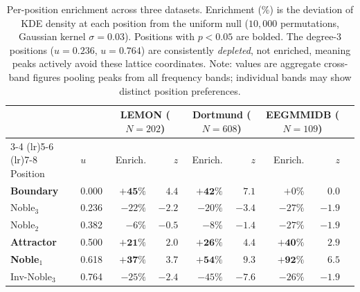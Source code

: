 \documentclass[11pt,a4paper]{article}
\begin{document}
\begin{table}[H]
\centering
\caption{Per-position enrichment across three datasets. Enrichment (\%) is the deviation of KDE density at each position from the uniform null ($10{,}000$ permutations, Gaussian kernel $\sigma = 0.03$). Positions with $p < 0.05$ are bolded. The degree-3 positions ($u = 0.236$, $u = 0.764$) are consistently \textit{depleted}, not enriched, meaning peaks actively avoid these lattice coordinates. Note: values are aggregate cross-band figures pooling peaks from all frequency bands; individual bands may show distinct position preferences.}
\label{tab:per_position}
\begin{tabular}{llrrrrrrr}
\toprule
& & \multicolumn{2}{c}{LEMON ($N = 202$)} & \multicolumn{2}{c}{Dortmund ($N = 608$)} & \multicolumn{2}{c}{EEGMMIDB ($N = 109$)} \\
\cmidrule(lr){3-4} \cmidrule(lr){5-6} \cmidrule(lr){7-8}
Position & $u$ & Enrich. & $z$ & Enrich. & $z$ & Enrich. & $z$ \\
\midrule
\textbf{Boundary} & 0.000 & $\mathbf{+45\%}$ & $\mathbf{4.4}$ & $\mathbf{+42\%}$ & $\mathbf{7.1}$ & $+0\%$ & $0.0$ \\
Noble$_3$ & 0.236 & $-22\%$ & $-2.2$ & $-20\%$ & $-3.4$ & $-27\%$ & $-1.9$ \\
Noble$_2$ & 0.382 & $-6\%$ & $-0.5$ & $-8\%$ & $-1.4$ & $-27\%$ & $-1.9$ \\
\textbf{Attractor} & 0.500 & $\mathbf{+21\%}$ & $\mathbf{2.0}$ & $\mathbf{+26\%}$ & $\mathbf{4.4}$ & $\mathbf{+40\%}$ & $\mathbf{2.9}$ \\
\textbf{Noble$_1$} & 0.618 & $\mathbf{+37\%}$ & $\mathbf{3.7}$ & $\mathbf{+54\%}$ & $\mathbf{9.3}$ & $\mathbf{+92\%}$ & $\mathbf{6.5}$ \\
Inv-Noble$_3$ & 0.764 & $-25\%$ & $-2.4$ & $-45\%$ & $-7.6$ & $-26\%$ & $-1.9$ \\
\bottomrule
\end{tabular}
\end{table}
\end{document}

